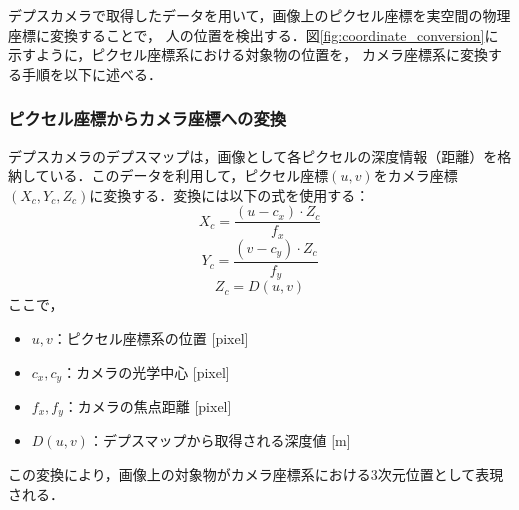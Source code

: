 デプスカメラで取得したデータを用いて，画像上のピクセル座標を実空間の物理座標に変換することで，
人の位置を検出する．図\ref{fig:coordinate_conversion}に示すように，ピクセル座標系における対象物の位置を，
カメラ座標系に変換する手順を以下に述べる．

\subsubsection{ピクセル座標からカメラ座標への変換}
デプスカメラのデプスマップは，画像として各ピクセルの深度情報（距離）を格納している．このデータを利用して，ピクセル座標$(u, v)$をカメラ座標$(X_c, Y_c, Z_c)$に変換する．変換には以下の式を使用する：
\begin{equation}
    X_c = \frac{(u - c_x) \cdot Z_c}{f_x}
    \label{eq:xc}
\end{equation}
\begin{equation}
    Y_c = \frac{(v - c_y) \cdot Z_c}{f_y}
    \label{eq:yc}
\end{equation}
\begin{equation}
    Z_c = D(u, v)
    \label{eq:zc}
\end{equation}
ここで，
\begin{itemize}
    \item $u, v$：ピクセル座標系の位置 [pixel]
    \item $c_x, c_y$：カメラの光学中心 [pixel]
    \item $f_x, f_y$：カメラの焦点距離 [pixel]
    \item $D(u, v)$：デプスマップから取得される深度値 [m]
\end{itemize}

この変換により，画像上の対象物がカメラ座標系における3次元位置として表現される．


